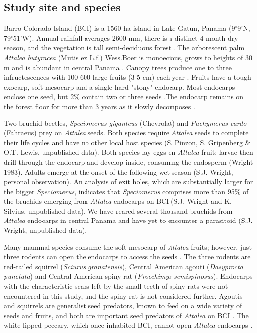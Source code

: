 \documentclass[b5paper,justified]{tufte-book} %
\begin{document}
\begin{fullwidth}
\subsection{Study site and species}
Barro Colorado Island (BCI) is a 1560-ha island in Lake Gatun, Panama (9$^{\circ}$9'N, 79$^{\circ}$51'W). Annual rainfall averages 2600 mm, there is a distinct 4-month dry season, and the vegetation is tall semi-deciduous forest \citep{Leigh1999}. The arborescent palm \textit{Attalea butyracea }(Mutis ex L.f.) Wess.Boer is monoecious, grows to heights of 30 m and is abundant in central Panama \citep{Foster1982, DeSteven1987}. Canopy trees produce one to three infructescences with 100-600 large fruits (3-5 cm) each year \citep{Wright1983}. Fruits have a tough exocarp, soft mesocarp and a single hard "stony" endocarp. Most endocarps enclose one seed, but 2\% contain two or three seeds \citep{Wright1983}.The endocarp remains on the forest floor for more than 3 years as it slowly decomposes \citep{Wright1983}.

Two bruchid beetles, \textit{Speciomerus giganteus }(Chevrolat) and \textit{Pachymerus cardo} (Fahraeus) prey on \textit{Attalea} seeds. Both species require \textit{Attalea }seeds to complete their life cycles and have no other local host species (S. Pinzon, S. Gripenberg \& O.T. Lewis, unpublished data). Both species lay eggs on \textit{Attalea} fruit; larvae then drill through the endocarp and develop inside, consuming the endosperm (Wright
1983). Adults emerge at the onset of the following wet season (S.J. Wright, personal observation). An analysis of exit holes, which are substantially larger for the bigger \textit{Speciomerus}, indicates that \textit{Speciomerus} comprises more than 95\% of the bruchids emerging from \textit{Attalea} endocarps on BCI (S.J. Wright and K. Silvius, unpublished data). We have reared several thousand bruchids from \textit{Attalea }endocarps in central Panama and have yet to encounter a parasitoid (S.J. Wright, unpublished data).

Many mammal species consume the soft mesocarp of \textit{Attalea} fruits; however, just three rodents can open the endocarps to access the seeds \citep{Wright2001a}. The three rodents are red-tailed squirrel (\textit{Sciurus granatensis}), Central American agouti (\textit{Dasyprocta punctata}) and Central American spiny rat (\textit{Proechimys semispinosus}). Endocarps with the characteristic scars left by the small teeth of spiny rats were not encountered in this study, and the spiny rat is not considered further. Agoutis and squirrels are generalist seed predators, known to feed on a wide variety of seeds and fruits, and both are important seed predators of \textit{Attalea} on BCI \citep{Heaney1978, Forget1994}. The white-lipped peccary, which once inhabited BCI, cannot open \textit{Attalea} endocarps \citep{Kiltie1982}. 


\end{fullwidth}
\end{document}
